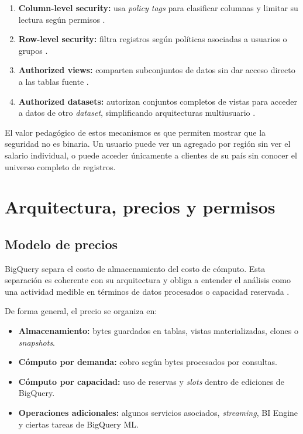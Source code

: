 \documentclass[12pt]{article}
\begin{document}
\begin{enumerate}[label=\textbf{G\arabic*.}, leftmargin=*]
\item \textbf{Column-level security:} usa \textit{policy tags} para clasificar columnas y limitar su lectura según permisos \cite{gcp_column_level_security,gcp_policy_tags_best_practices}.
\item \textbf{Row-level security:} filtra registros según políticas asociadas a usuarios o grupos \cite{gcp_row_level_security}.
\item \textbf{Authorized views:} comparten subconjuntos de datos sin dar acceso directo a las tablas fuente \cite{gcp_authorized_views}.
\item \textbf{Authorized datasets:} autorizan conjuntos completos de vistas para acceder a datos de otro \textit{dataset}, simplificando arquitecturas multiusuario \cite{gcp_authorized_datasets}.
\end{enumerate}

El valor pedagógico de estos mecanismos es que permiten mostrar que la seguridad no es binaria. Un usuario puede ver un agregado por región sin ver el salario individual, o puede acceder únicamente a clientes de su país sin conocer el universo completo de registros.

\section{Arquitectura, precios y permisos}
\subsection{Modelo de precios}
BigQuery separa el costo de almacenamiento del costo de cómputo. Esta separación es coherente con su arquitectura y obliga a entender el análisis como una actividad medible en términos de datos procesados o capacidad reservada \cite{gcp_bigquery_pricing,gcp_storage_overview}.

De forma general, el precio se organiza en:

\begin{itemize}[leftmargin=*]
\item \textbf{Almacenamiento:} bytes guardados en tablas, vistas materializadas, clones o \textit{snapshots}.
\item \textbf{Cómputo por demanda:} cobro según bytes procesados por consultas.
\item \textbf{Cómputo por capacidad:} uso de reservas y \textit{slots} dentro de ediciones de BigQuery.
\item \textbf{Operaciones adicionales:} algunos servicios asociados, \textit{streaming}, BI Engine y ciertas tareas de BigQuery ML.
\end{itemize}
\end{document}

